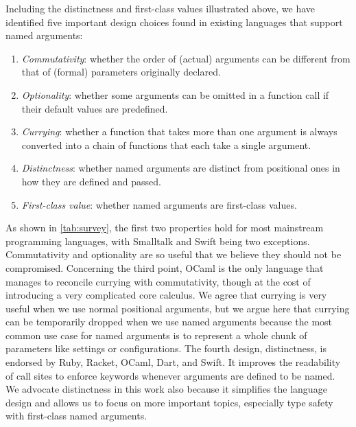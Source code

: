 Including the distinctness and first-class values illustrated above, we have
identified five important design choices found in existing languages that
support named arguments:
\begin{enumerate}
\item \emph{Commutativity}: whether the order of (actual) arguments can be
      different from that of (formal) parameters originally declared.
\item \emph{Optionality}: whether some arguments can be omitted in a function
      call if their default values are predefined.
\item \emph{Currying}: whether a function that takes more than one argument is
      always converted into a chain of functions that each take a single
      argument.
\item \emph{Distinctness}: whether named arguments are distinct from positional
      ones in how they are defined and passed.
\item \emph{First-class value}: whether named arguments are first-class values.
\end{enumerate}
As shown in \autoref{tab:survey}, the first two properties hold for most
mainstream programming languages, with Smalltalk and Swift being two exceptions.
Commutativity and optionality are so useful that we believe they should not be
compromised. Concerning the third point, OCaml is the only language that manages
to reconcile currying with commutativity, though at the cost of introducing a
very complicated core calculus. We agree that currying is very useful when we
use normal positional arguments, but we argue here that currying can be
temporarily dropped when we use named arguments because the most common use case
for named arguments is to represent a whole chunk of parameters like settings or
configurations. The fourth design, distinctness, is endorsed by Ruby, Racket,
OCaml, Dart, and Swift. It improves the readability of call sites to enforce
keywords whenever arguments are defined to be named. We advocate distinctness in
this work also because it simplifies the language design and allows us to focus
on more important topics, especially type safety with first-class named
arguments.

